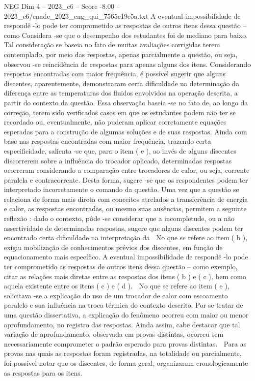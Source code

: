 \begin{textsample}{NEG Dim 4 – 2023\_c6 – Score -8.00 – 2023\_c6/enade\_2023\_eng\_qui\_7565c19e5a.txt}
A eventual impossibilidade de respondê -lo pode ter comprometido as respostas de outros itens dessa questão – como Considera -se que o desempenho dos estudantes foi de mediano para baixo.
Tal consideração se baseia no fato de muitas avaliações corrigidas terem contemplado, por meio das respostas, apenas parcialmente a questão, ou seja, observou -se reincidência de respostas para apenas alguns dos itens.
Considerando respostas encontradas com maior frequência, é possível sugerir que alguns discentes, aparentemente, demonstraram certa dificuldade na determinação da diferença entre as temperaturas dos fluidos envolvidos na operação descrita, a partir do contexto da questão.
Essa observação baseia -se no fato de, ao longo da correção, terem sido verificados casos em que os estudantes podem não ter se recordado ou, eventualmente, não puderam aplicar corretamente equações esperadas para a construção de algumas soluções e de suas respostas.
Ainda com base nas respostas encontradas com maior frequência, trazendo certa especificidade, salienta -se que, para o item ( e ), ao invés de alguns discentes discorrerem sobre a influência do trocador aplicado, determinadas respostas ocorreram considerando a comparação entre trocadores de calor, ou seja, corrente paralela e contracorrente.
Desta forma, sugere -se que os respondentes podem ter interpretado incorretamente o comando da questão.
Uma vez que a questão se relaciona de forma mais direta com conceitos atrelados a transferência de energia e calor, as respostas encontradas, ou mesmo suas ausências, permitem a seguinte reflexão : dado o contexto, pôde -se considerar que a incompletude, ou a não assertividade de determinadas respostas, sugere que alguns discentes podem ter encontrado certa dificuldade na interpretação da  No que se refere ao item ( b ), exigiu mobilização de conhecimentos prévios dos discentes, em função de equacionamento mais específico.
A eventual impossibilidade de respondê -lo pode ter comprometido as respostas de outros itens dessa questão – como exemplo, citar as relações mais diretas entre as respostas dos itens ( b ) e ( c ), bem como aquela existente entre os itens ( c ) e ( d ).  No que se refere ao item ( e ), solicitava -se a explicação do uso de um trocador de calor com escoamento paralelo e sua influência na troca térmica do contexto descrito.
Por se tratar de uma questão dissertativa, a explicação do fenômeno ocorreu com maior ou menor aprofundamento, no registro das respostas.
Ainda assim, cabe destacar que tal variação de aprofundamento, observada em provas distintas, ocorreu sem necessariamente comprometer o padrão esperado para provas distintas.  Para as provas nas quais as respostas foram registradas, na totalidade ou parcialmente, foi possível notar que os discentes, de forma geral, organizaram cronologicamente as respostas para os itens.

\end{textsample}
